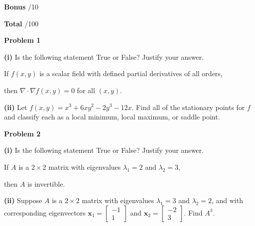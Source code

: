 \documentclass[12pt]{amsbook}
\begin{document}
\vspace{.25cm}

\textbf{Bonus} \;\hspace{.9cm} \underline{\hspace{.75cm}}/10

\vspace{.25cm}

\textbf{Total} \;\hspace{1.1cm} \underline{\hspace{.75cm}}/100










\newpage

\textbf{Problem 1}

\vspace{.25cm}

\textbf{(i)} Is the following statement True or False? Justify your answer.
\begin{center}
If $f(x,y)$ is a scalar field with defined partial derivatives of all orders, 

then $\nabla \cdot \nabla f(x,y) = 0$ for all $(x,y)$.
\end{center}

\vspace{5cm}

\textbf{(ii)} Let $f(x,y) = x^3 + 6xy^2 - 2y^3 - 12x$. Find all of the stationary points for $f$ and classify each as a local minimum, local maximum, or saddle point.








\newpage

\textbf{Problem 2}

\vspace{.25cm}

\textbf{(i)} Is the following statement True or False? Justify your answer.
\begin{center}
If $A$ is a $2\times 2$ matrix with eigenvalues $\lambda_1 = 2$ and $\lambda_2 = 3$,

then $A$ is invertible.
\end{center}

\vspace{5cm}


\textbf{(ii)} Suppose $A$ is a $2\times 2$ matrix with eigenvalues $\lambda_1 = 3$ and $\lambda_2 = 2$, and with corresponding eigenvectors $\textbf{x}_1 = \left[\begin{array}{c} -1 \\ 1\end{array}\right]$ and $\textbf{x}_2 = \left[\begin{array}{c} -2 \\ 3 \end{array}\right]$. Find $A^3$.
\end{document}
